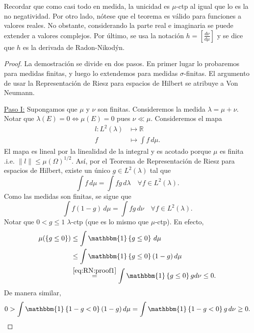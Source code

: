 \documentclass{article}
\theoremstyle{plain}
\theoremstyle{definition}
\newcommand{\1}[1]{\mathbbm{1}\left\{ #1 \right\}}
\newcommand{\R}{\mathbb{R}}
\newcommand{\norm}[1]{\lVert #1 \rVert}
\begin{document}
Recordar que como casi todo en medida, la unicidad es \(\mu\)-ctp al igual que lo es la no negatividad. 
Por otro lado, nótese que el teorema es válido para funciones a valores reales. No obstante, considerando
la parte real e imaginaria se puede extender a valores complejos. Por último, 
se usa la notación \(h = [\frac{d\nu}{d\mu}]\) y se dice que \(h\) es la derivada de Radon-Nikodýn. 

\begin{proof}
  La demostración se divide en dos pasos. En primer lugar lo probaremos para medidas finitas, y luego
  lo extendemos para medidas \(\sigma\)-finitas. El argumento de usar la Representación de Riesz
  para espacios de Hilbert se atribuye a Von Neumann.

  \underline{Paso I:} Supongamos que \(\mu\) y \(\nu\) son finitas. Consideremos la medida
  \(\lambda = \mu + \nu\). Notar que \(\lambda(E) = 0 \iff \mu(E) = 0\) pues \(\nu \ll \mu\).
  Consideremos el mapa 
  \begin{align*}
    l \colon L^{2}(\lambda) &\mapsto \R\\
    f &\mapsto \int f \, d\mu.
  \end{align*}
  El mapa es lineal por la linealidad de la integral y es acotado porque \(\mu\) es finita
  .i.e. \(\norm{l} \le \mu(\Omega)^{1/2}\). Así, por el Teorema de Representación de Riesz para 
  espacios de Hilbert, existe un único \(g\in L^{2}(\lambda)\) tal que
  \begin{displaymath}
    \int f \, d\mu = \int fg\, d\lambda
    \quad\forall f\in L^2(\lambda).
  \end{displaymath}
  Como las medidas son finitas, se sigue que
  \begin{equation}\label{eq:RN:proof1}
    \int f(1-g)\, d\mu = \int fg \, d\nu
    \quad\forall f\in L^2(\lambda).
  \end{equation}
  Notar que \(0 < g \le 1\) \(\lambda\)-ctp (que es lo mismo que \(\mu\)-ctp). En efecto,
  \begin{align*}
    \mu(\left\{ g \le 0 \right\})
    &\le
    \int \1{g \le 0} \, d\mu
    \\&\le
    \int \1{g \le 0} (1-g) \, d\mu
    \\&\overset{\eqref{eq:RN:proof1}}{=}
    \int \1{g \le 0} g d\nu
    \le 0.
  \end{align*}
  De manera similar,
  \begin{displaymath}
    0 >
    \int \1{1-g < 0} (1-g) \, d\mu
    =
    \int \1{1-g < 0} g \, d\nu
    \ge 0.
  \end{displaymath}

\end{proof}
\end{document}
